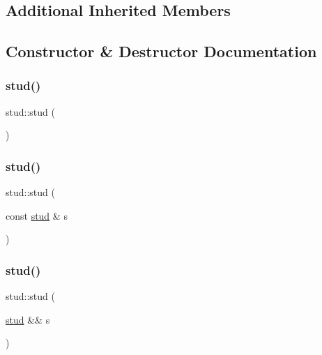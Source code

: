 \subsection*{Additional Inherited Members}


\subsection{Constructor \& Destructor Documentation}
\mbox{\label{structstud_ab6ed07f01c0452711eccaaa57a75d669}} 
\subsubsection{\texorpdfstring{stud()}{stud()}\hspace{0.1cm}{\footnotesize\ttfamily [1/3]}}
{\footnotesize\ttfamily stud\+::stud (\begin{DoxyParamCaption}{ }\end{DoxyParamCaption})\hspace{0.3cm}{\ttfamily [inline]}}

\mbox{\label{structstud_a5d3f14694ec6a1eb8a20cd8538abadf5}} 
\subsubsection{\texorpdfstring{stud()}{stud()}\hspace{0.1cm}{\footnotesize\ttfamily [2/3]}}
{\footnotesize\ttfamily stud\+::stud (\begin{DoxyParamCaption}\item[{const \mbox{\hyperlink{structstud}{stud}} \&}]{s }\end{DoxyParamCaption})}

\mbox{\label{structstud_a806a780e55ad061bc78180d74a5c23bf}} 
\subsubsection{\texorpdfstring{stud()}{stud()}\hspace{0.1cm}{\footnotesize\ttfamily [3/3]}}
{\footnotesize\ttfamily stud\+::stud (\begin{DoxyParamCaption}\item[{\mbox{\hyperlink{structstud}{stud}} \&\&}]{s }\end{DoxyParamCaption})\hspace{0.3cm}{\ttfamily [noexcept]}}




